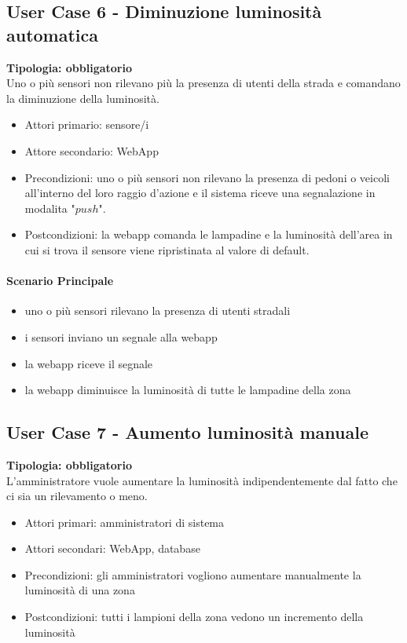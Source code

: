 \documentclass[12pt]{article}
\begin{document}
\subsection{User Case 6 - Diminuzione luminosità automatica}
\textbf{Tipologia: obbligatorio}\\
Uno o più sensori non rilevano più la presenza di utenti della strada e comandano la diminuzione della luminosità.
\begin{itemize}
	\item Attori primario: sensore/i
	\item Attore secondario: WebApp
	\item Precondizioni: uno o più sensori non rilevano la presenza di pedoni o veicoli all'interno del loro raggio d'azione e il sistema riceve una segnalazione in modalita "$push$".
	\item Postcondizioni: la webapp comanda le lampadine e la luminosità dell'area in cui si trova il sensore viene ripristinata al valore di default.
\end{itemize}
\paragraph{Scenario Principale}
\begin{itemize}
	\item uno o più sensori rilevano la presenza di utenti stradali
	\item i sensori inviano un segnale alla webapp
	\item la webapp riceve il segnale
	\item la webapp diminuisce la luminosità di tutte le lampadine della zona
\end{itemize}

\subsection{User Case 7 - Aumento luminosità manuale}
\textbf{Tipologia: obbligatorio} \\
L'amministratore vuole aumentare la luminosità indipendentemente dal fatto che ci sia un rilevamento o meno.
\begin{itemize}
	\item Attori primari: amministratori di sistema
	\item Attori secondari: WebApp, database
	\item Precondizioni: gli amministratori vogliono aumentare manualmente la luminosità di una zona
	\item Postcondizioni: tutti i lampioni della zona vedono un incremento della luminosità
\end{itemize}
\end{document}

